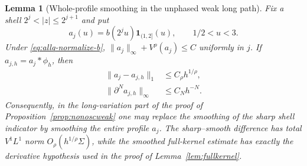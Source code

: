 \documentclass[11pt]{article}
\numberwithin{equation}{section}
\newtheorem{lemma}[theorem]{Lemma}
\theoremstyle{remark}
\theoremstyle{definition}
\begin{document}
\begin{lemma}[Whole-profile smoothing in the unphased weak long path]
\label{lem:allq-whole-profile-smoothing}
Fix a shell $2^j<|z|\le2^{j+1}$ and put
\[
 a_j(u)=b(2^ju)\mathbf1_{(1,2]}(u),
 \qquad 1/2<u<3.
\]
Under \eqref{eq:allq-normalize-b},
$\|a_j\|_\infty+V^\rho(a_j)\le C$ uniformly in $j$.  If
$a_{j,h}=a_j*\phi_h$, then
\begin{align}
 \|a_j-a_{j,h}\|_1&\le C_\rho h^{1/\rho},
 \label{eq:allq-weak-smooth-L1}\\
 \|\partial^Na_{j,h}\|_\infty&\le C_Nh^{-N}.
 \label{eq:allq-weak-smooth-derivative}
\end{align}
Consequently, in the long-variation part of the proof of Proposition~\ref{prop:nonoscweak} one
may replace the smoothing of the sharp shell indicator by smoothing the
entire profile $a_j$.  The sharp--smooth difference has total
$V^1L^1$ norm $O_\rho(h^{1/\rho}\Sigma)$, while the smoothed full-kernel
estimate has exactly the derivative hypothesis used in the proof of Lemma~\ref{lem:fullkernel}.
\end{lemma}
\end{document}
